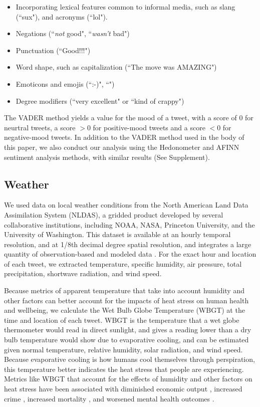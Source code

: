 \documentclass[fleqn,10pt]{wlscirep}
\begin{document}
\begin{itemize}
  \item Incorporating lexical features common to informal media, such as slang (``sux"), and acronyms (``lol").
  \item Negations (``\textit{not} good", ``\textit{wasn't} bad")
  \item Punctuation (``Good!!!")
  \item Word shape, such as capitalization (``The move was AMAZING")
  \item Emoticons and emojis (``:-)", ``\emojismile")
  \item Degree modifiers (``very excellent" or ``kind of crappy")
\end{itemize} 

The VADER method yields a value for the mood of a tweet, with a score of 0 for neurtral tweets, a score $> 0$ for positive-mood tweets and a score $< 0$ for negative-mood tweets.  In addition to the VADER method used in the body of this paper, we also conduct our analysis using the Hedonometer and AFINN sentiment analysis methods, with similar results (See Supplement).

\subsection*{Weather}
We used data on local weather conditions from the North American Land Data Assimilation System (NLDAS), a gridded product developed by several collaborative institutions, including NOAA, NASA, Princeton University, and the University of Washington.  This dataset is available at an hourly temporal resolution, and at 1/8th decimal degree spatial resolution, and integrates a large quantity of observation-based and modeled data  \cite{xia_continental-scale_2012}.  For the exact hour and location of each tweet, we extracted temperature, specific humidity, air pressure, total precipitation, shortwave radiation, and wind speed.  

Because metrics of apparent temperature that take into account humidity and other factors can better account for the impacts of heat stress on human health and wellbeing, we calculate the Wet Bulb Globe Temperature (WBGT) at the time and location of each tweet.  WBGT is the temperature that a wet globe thermometer would read in direct sunlight, and gives a reading lower than a dry bulb temperature would show due to evaporative cooling, and can be estimated given normal temperature, relative humidity, solar radiation, and wind speed.  Because evaporative cooling is how humans cool themselves through perspiration, this temperature better indicates the heat stress that people are experiencing.  Metrics like WBGT that account for the effects of humidity and other factors on heat stress have been associated with diminished economic output \cite{rao2020projections}, increased crime \cite{hu2017impact}, increased mortality \cite{chien2016spatiotemporal, armstrong2019role}, and worsened mental health outcomes \cite{vida2012relationship, ding2016importance}.
\end{document}

